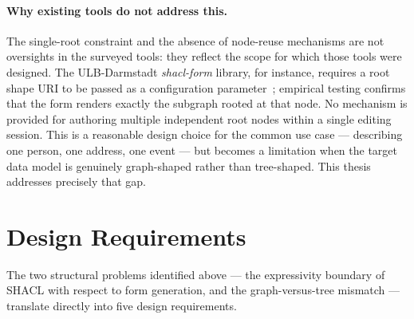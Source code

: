 \paragraph{Why existing tools do not address this.}
The single-root constraint and the absence of node-reuse mechanisms are not oversights in the surveyed tools: they reflect the scope for which those tools were designed.
The ULB-Darmstadt \textit{shacl-form} library, for instance, requires a root shape URI to be passed as a configuration parameter~\cite{ulb-darmstadt-shacl-form}; empirical testing confirms that the form renders exactly the subgraph rooted at that node.
No mechanism is provided for authoring multiple independent root nodes within a single editing session.
This is a reasonable design choice for the common use case --- describing one person, one address, one event --- but becomes a limitation when the target data model is genuinely graph-shaped rather than tree-shaped.
This thesis addresses precisely that gap.

\section{Design Requirements}
\label{sec:requirements}

The two structural problems identified above --- the expressivity boundary of SHACL with respect to form generation, and the graph-versus-tree mismatch --- translate directly into five design requirements.

